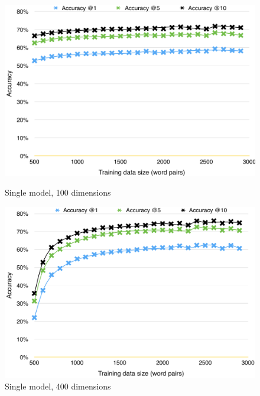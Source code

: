 \begin{figure}[!htb]
    \centering
    \begin{minipage}{\textwidth}
      \centering
      \begin{minipage}{0.45\linewidth}
          \includegraphics[width=\linewidth]{images/single_model_100_dim}
          \caption{Single model, 100 dimensions}
          \label{fig:sm_100}
      \end{minipage}
      \begin{minipage}{0.45\linewidth}
          \includegraphics[width=\linewidth]{images/single_model_400_dim}
          \caption{Single model, 400 dimensions}
          \label{fig:sm_400}
      \end{minipage}
    \end{minipage}
\end{figure}

